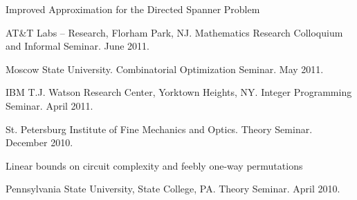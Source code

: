 \documentclass[11pt]{article}
\newenvironment{innerlist}[1][\enskip\textbullet]%
        {\begin{compactitem}[#1]}{\end{compactitem}}
\newcommand{\blankline}{\quad\pagebreak[2]}
\begin{document}
\begin{innerlist}
\item Improved Approximation for the Directed Spanner Problem
\begin{innerlist}
  \item AT\&T Labs -- Research, Florham Park, NJ. Mathematics Research Colloquium and Informal Seminar. June 2011.
  \item Moscow State University. Combinatorial Optimization Seminar. May 2011.
  \item IBM T.J. Watson Research Center, Yorktown Heights, NY. Integer Programming Seminar. April 2011.
  \item St. Petersburg Institute of Fine Mechanics and Optics. Theory Seminar. December 2010.
\end{innerlist}
\item Linear bounds on circuit complexity and feebly one-way permutations
    \begin{innerlist}
      \item Pennsylvania State University, State College, PA. Theory Seminar. April 2010.
    \end{innerlist}
\end{innerlist}
\blankline
\end{document}
